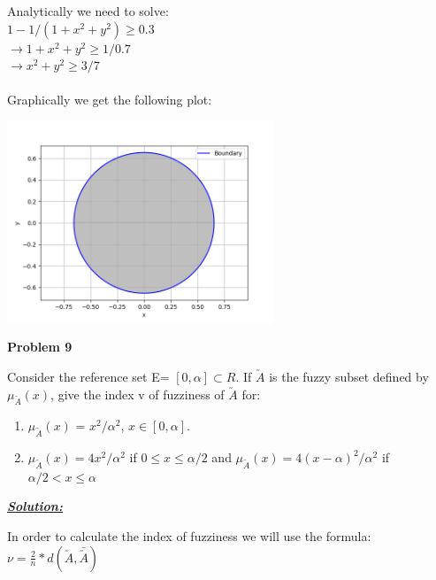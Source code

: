 \documentclass{article}
\begin{document}
\noindent Analytically we need to solve: \\
$1-1/(1+x^2+y^2) \geq 0.3 $ \\ $\rightarrow 1+x^2+y^2 \geq 1/0.7 $ \\
$ \rightarrow x^2 + y^2 \geq 3/7$
\\ \\
\noindent Graphically we get the following plot:

\begin{center}
\includegraphics[width=0.6\textwidth]{Problem8.png}
\end{center}


\newpage
\noindent \textbf{Problem 9}

\noindent Consider the reference set E= $[0, \alpha] \subset R$. If $\utilde{A}$ is the fuzzy subset defined by 
$\mu_{\utilde{A}}(x)$, give the index v of fuzziness of $\utilde{A}$ for:

\begin{enumerate} [label=\Alph*]
  \item $\mu_{\utilde{A}}(x)$ = $x^2/\alpha^2$, $x \in [0, \alpha].$
  \item $\mu_{\utilde{A}}(x) = 4x^2/\alpha^2$ if $0 \leq x\leq \alpha/2$ and $\mu_{\utilde{A}}(x) = 4(x-\alpha)^2/\alpha^2$ if $\alpha/2  <x \leq \alpha$
\end{enumerate}

\vspace{1cm}
\noindent \underline{\textbf{\textit{Solution:}}}

\noindent In order to calculate the index of fuzziness we will use the formula: $\nu = \frac{2}{n} * d(\utilde A,  \bar{ \utilde{ A}})$
\end{document}
